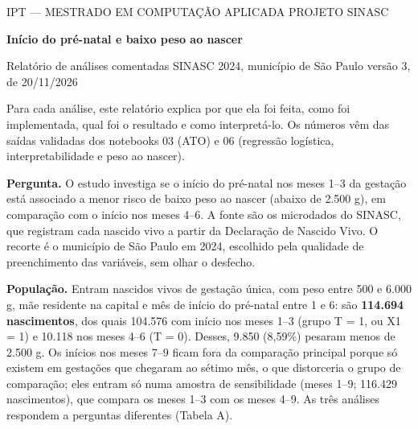 \documentclass[10pt,a4paper]{article}
\newcommand{\secao}[2]{\par\needspace{6\baselineskip}\vspace{8pt}{\color{iptescuro}\bfseries\large{\color{iptazul}#1}~#2}\par
  \vspace{-2pt}{\color{iptgrade}\rule{\linewidth}{0.8pt}}\par\vspace{1pt}}
\begin{document}
\small

\begin{tcolorbox}[enhanced, colback=iptescuro, boxrule=0pt, frame hidden, sharp corners, borderline south={2.5pt}{0pt}{iptciano}, left=9pt, right=9pt, top=6pt, bottom=7pt]

{\color{white}\scriptsize IPT --- MESTRADO EM COMPUTAÇÃO APLICADA \textperiodcentered{} PROJETO SINASC}\par\vspace{2pt}

{\color{white}\bfseries\LARGE Início do pré-natal e baixo peso ao nascer}\par\vspace{2pt}

{\color{white}\footnotesize Relatório de análises comentadas \textperiodcentered{} SINASC 2024, município de São Paulo \textperiodcentered{} versão 3, de 20/11/2026}

\end{tcolorbox}

{\color{iptcinza}Para cada análise, este relatório explica por que ela foi feita, como foi implementada, qual foi o resultado e como interpretá-lo. Os números vêm das saídas validadas dos notebooks 03 (ATO) e 06 (regressão logística, interpretabilidade e peso ao nascer).\par}

\secao{1.}{Objetivo e população}

{\color{iptescuro}\bfseries Pergunta.} O estudo investiga se o início do pré-natal nos meses 1--3 da gestação está associado a menor risco de baixo peso ao nascer (abaixo de 2.500 g), em comparação com o início nos meses 4--6. A fonte são os microdados do SINASC, que registram cada nascido vivo a partir da Declaração de Nascido Vivo. O recorte é o município de São Paulo em 2024, escolhido pela qualidade de preenchimento das variáveis, sem olhar o desfecho.\par

{\color{iptescuro}\bfseries População.} Entram nascidos vivos de gestação única, com peso entre 500 e 6.000 g, mãe residente na capital e mês de início do pré-natal entre 1 e 6: são \textbf{114.694 nascimentos}, dos quais 104.576 com início nos meses 1--3 (grupo T = 1, ou X1 = 1) e 10.118 nos meses 4--6 (T = 0). Desses, 9.850 (8,59\%) pesaram menos de 2.500 g. Os inícios nos meses 7--9 ficam fora da comparação principal porque só existem em gestações que chegaram ao sétimo mês, o que distorceria o grupo de comparação; eles entram só numa amostra de sensibilidade (meses 1--9; 116.429 nascimentos), que compara os meses 1--3 com os meses 4--9. As três análises respondem a perguntas diferentes (Tabela A).\par
\end{document}
